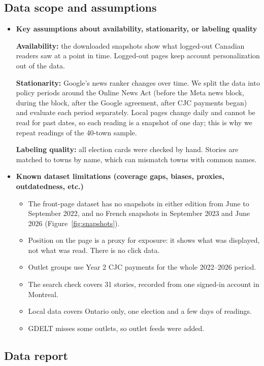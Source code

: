 \documentclass[11pt,letterpaper]{article}
\newcommand{\q}[1]{\item \textbf{#1}\par}
\begin{document}
\subsection{Data scope and assumptions}
\begin{itemize}
\q{Key assumptions about availability, stationarity, or labeling quality}
\textbf{Availability:} the downloaded snapshots show what logged-out Canadian readers saw at a point in time. Logged-out pages keep account personalization out of the data.

\textbf{Stationarity:} Google's news ranker changes over time. We split the data into policy periods around the Online News Act (before the Meta news block, during the block, after the Google agreement, after CJC payments began) and evaluate each period separately. Local pages change daily and cannot be read for past dates, so each reading is a snapshot of one day; this is why we repeat readings of the 40-town sample.

\textbf{Labeling quality:} all election cards were checked by hand. Stories are matched to towns by name, which can mismatch towns with common names.

\q{Known dataset limitations (coverage gaps, biases, proxies, outdatedness, etc.)}
\begin{itemize}
\item The front-page dataset has no snapshots in either edition from June to September 2022, and no French snapshots in September 2023 and June 2026 (Figure~\ref{fig:snapshots}).
\item Position on the page is a proxy for exposure: it shows what was displayed, not what was read. There is no click data.
\item Outlet groups use Year 2 CJC payments for the whole 2022--2026 period.
\item The search check covers 31 stories, recorded from one signed-in account in Montreal.
\item Local data covers Ontario only, one election and a few days of readings.
\item GDELT misses some outlets, so outlet feeds were added.
\end{itemize}
\end{itemize}

\subsection{Data report}
\end{document}
